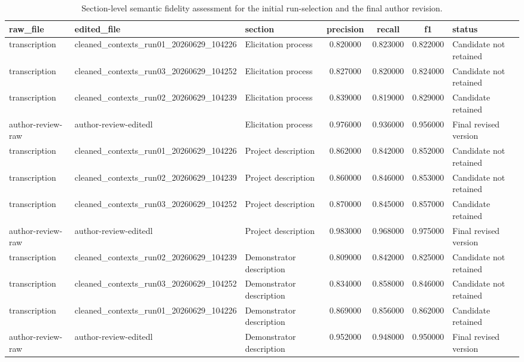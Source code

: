 \begin{table}
\caption{Section-level semantic fidelity assessment for the initial run-selection and the final author revision.}
\label{tab:text_cleaning_semantic_fidelity}
\begin{tabular}{ll l c c c l}
\toprule
raw_file & edited_file & section & precision & recall & f1 & status \\
\midrule
transcription & cleaned_contexts_run01_20260629_104226 & Elicitation process & 0.820000 & 0.823000 & 0.822000 & Candidate not retained \\
transcription & cleaned_contexts_run03_20260629_104252 & Elicitation process & 0.827000 & 0.820000 & 0.824000 & Candidate not retained \\
transcription & cleaned_contexts_run02_20260629_104239 & Elicitation process & 0.839000 & 0.819000 & 0.829000 & Candidate retained \\
author-review-raw & author-review-editedl & Elicitation process & 0.976000 & 0.936000 & 0.956000 & Final revised version \\
transcription & cleaned_contexts_run01_20260629_104226 & Project description & 0.862000 & 0.842000 & 0.852000 & Candidate not retained \\
transcription & cleaned_contexts_run02_20260629_104239 & Project description & 0.860000 & 0.846000 & 0.853000 & Candidate not retained \\
transcription & cleaned_contexts_run03_20260629_104252 & Project description & 0.870000 & 0.845000 & 0.857000 & Candidate retained \\
author-review-raw & author-review-editedl & Project description & 0.983000 & 0.968000 & 0.975000 & Final revised version \\
transcription & cleaned_contexts_run02_20260629_104239 & Demonstrator description & 0.809000 & 0.842000 & 0.825000 & Candidate not retained \\
transcription & cleaned_contexts_run03_20260629_104252 & Demonstrator description & 0.834000 & 0.858000 & 0.846000 & Candidate not retained \\
transcription & cleaned_contexts_run01_20260629_104226 & Demonstrator description & 0.869000 & 0.856000 & 0.862000 & Candidate retained \\
author-review-raw & author-review-editedl & Demonstrator description & 0.952000 & 0.948000 & 0.950000 & Final revised version \\
\bottomrule
\end{tabular}
\end{table}
